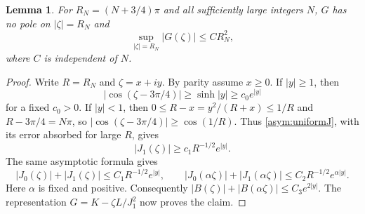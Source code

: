 \documentclass[11pt]{article}
\newtheorem{lemma}[theorem]{Lemma}
\theoremstyle{remark}
\begin{document}
\begin{lemma}\label{asym:circles}
For $R_N=(N+3/4)\pi$ and all sufficiently large integers $N$,
$G$ has no pole on $|\zeta|=R_N$ and
\[
 \sup_{|\zeta|=R_N}|G(\zeta)|\le C R_N^2,
\]
where $C$ is independent of $N$.
\end{lemma}
\begin{proof}
Write $R=R_N$ and $\zeta=x+iy$. By parity assume $x\ge0$.
If $|y|\ge1$, then
\[
 |\cos(\zeta-3\pi/4)|\ge\sinh|y|\ge c_0 e^{|y|}
\]
for a fixed $c_0>0$. If $|y|<1$, then
$0\le R-x=y^2/(R+x)\le1/R$ and $R-3\pi/4=N\pi$, so
$|\cos(\zeta-3\pi/4)|\ge\cos(1/R)$.
Thus \eqref{asym:uniformJ}, with its error absorbed for large $R$, gives
\[
 |J_1(\zeta)|\ge c_1R^{-1/2}e^{|y|}.
\]
The same asymptotic formula gives
\[
 |J_0(\zeta)|+|J_1(\zeta)|\le C_1R^{-1/2}e^{|y|},\qquad
 |J_0(\alpha\zeta)|+|J_1(\alpha\zeta)|
       \le C_2R^{-1/2}e^{\alpha|y|}.
\]
Here $\alpha$ is fixed and positive. Consequently
$|B(\zeta)|+|B(\alpha\zeta)|\le C_3e^{2|y|}$.
The representation $G=K-\zeta L/J_1^2$ now proves the claim.
\end{proof}
\end{document}
